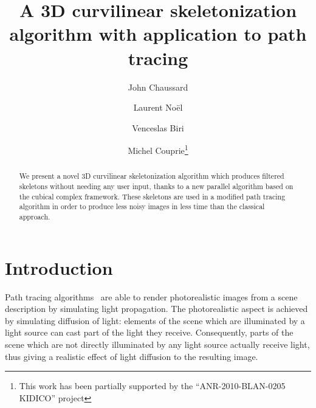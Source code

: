 \documentclass[final,envcountsame]{llncs}
\def\quotes#1{``#1''}
\begin{document}
\mainmatter

\title{A 3D curvilinear skeletonization algorithm with application to path tracing}
\author{John Chaussard \and Laurent No\"{e}l \and Venceslas Biri \and Michel Couprie\thanks{This work has been partially supported by the \quotes{ANR-2010-BLAN-0205 KIDICO} project}}


\maketitle


\begin{abstract}
We present a novel 3D curvilinear skeletonization algorithm which produces filtered skeletons without needing any user input, thanks to a new parallel algorithm based on the cubical complex framework. These skeletons are used in a modified path tracing algorithm in order to produce less noisy images in less time than the classical approach.
\end{abstract}



\section{Introduction}
\label{sec::intro}

Path tracing algorithms~\cite{Ka86,LW93} are able to render photorealistic images from a scene description by simulating light propagation. The photorealistic aspect is achieved by simulating diffusion of light: elements of the scene which are illuminated by a light source can cast part of the light they receive. Consequently, parts of the scene which are not directly illuminated by any light source actually receive light, thus giving a realistic effect of light diffusion to the resulting image. 
\end{document}
